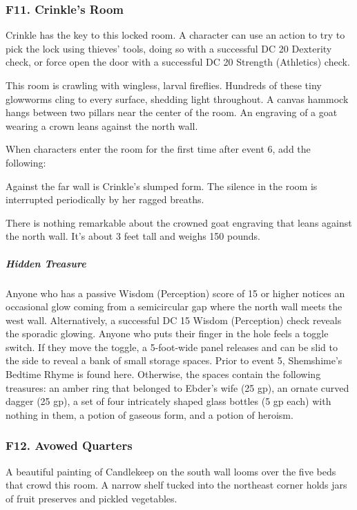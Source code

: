 \documentclass[10pt,a4paper,twoside,bg=print,twocolumn,openany,nodeprecatedcode]{dndbook}
\begin{document}
\subsubsection{F11. Crinkle's Room}
Crinkle has the key to this locked room. A character can use an action to try to pick the lock using thieves' tools, doing so with a successful DC 20 Dexterity check, or force open the door with a successful DC 20 Strength (Athletics) check.

\begin{DndReadAloud}{}
This room is crawling with wingless, larval fireflies. Hundreds of these tiny glowworms cling to every surface, shedding light throughout. A canvas hammock hangs between two pillars near the center of the room. An engraving of a goat wearing a crown leans against the north wall.

\end{DndReadAloud}

When characters enter the room for the first time after event 6, add the following:

\begin{DndReadAloud}{}
Against the far wall is Crinkle's slumped form. The silence in the room is interrupted periodically by her ragged breaths.

\end{DndReadAloud}

There is nothing remarkable about the crowned goat engraving that leans against the north wall. It's about 3 feet tall and weighs 150 pounds.

\subparagraph{Hidden Treasure}
Anyone who has a passive Wisdom (Perception) score of 15 or higher notices an occasional glow coming from a semicircular gap where the north wall meets the west wall. Alternatively, a successful DC 15 Wisdom (Perception) check reveals the sporadic glowing. Anyone who puts their finger in the hole feels a toggle switch. If they move the toggle, a 5-foot-wide panel releases and can be slid to the side to reveal a bank of small storage spaces. Prior to event 5, Shemshime's Bedtime Rhyme is found here. Otherwise, the spaces contain the following treasures: an amber ring that belonged to Ebder's wife (25 gp), an ornate curved dagger (25 gp), a set of four intricately shaped glass bottles (5 gp each) with nothing in them, a potion of gaseous form, and a potion of heroism.

\subsubsection{F12. Avowed Quarters}
\begin{DndReadAloud}{}
A beautiful painting of Candlekeep on the south wall looms over the five beds that crowd this room. A narrow shelf tucked into the northeast corner holds jars of fruit preserves and pickled vegetables.

\end{DndReadAloud}
\end{document}
